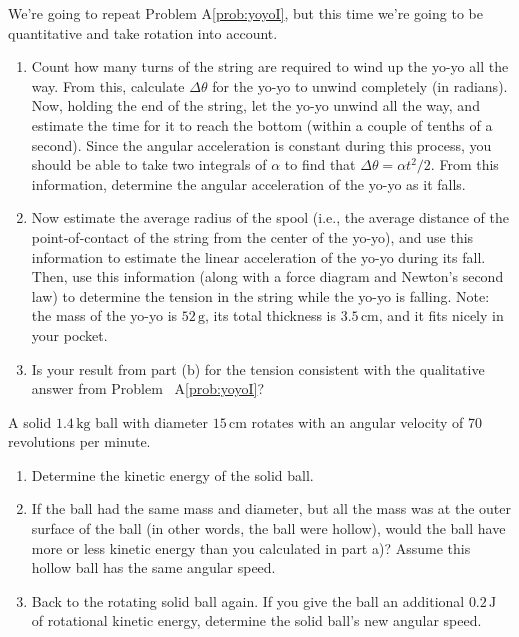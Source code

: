 \begin{exercise}
  We're going to repeat Problem A\ref{prob:yoyoI}, but this time we're
  going to be quantitative and take rotation into account.
  \begin{enumerate}
  \item Count how many turns of the string are required to wind up the
    yo-yo all the way.  From this, calculate $\Delta\theta$ for the
    yo-yo to unwind completely (in radians).  Now, holding the end of
    the string, let the yo-yo unwind all the way, and estimate the
    time for it to reach the bottom (within a couple of tenths of a
    second). Since the angular acceleration is constant during this
    process, you should be able to take two integrals of $\alpha$ to
    find that $\Delta\theta = \alpha t^2/2$.  From this information,
    determine the angular acceleration of the yo-yo as it falls.

  \item Now estimate the average radius of the spool (i.e., the
    average distance of the point-of-contact of the string from the
    center of the yo-yo), and use this information to estimate the
    linear acceleration of the yo-yo during its fall.  Then, use this
    information (along with a force diagram and Newton's second law)
    to determine the tension in the string while the yo-yo is falling.
    Note: the mass of the yo-yo is $52\,\text{g}$, its total
    thickness is $3.5\,\text{cm}$, and it fits nicely in your pocket.

  \item Is your result from part (b) for the tension consistent with
    the qualitative answer from Problem~ A\ref{prob:yoyoI}?

  \end{enumerate}
\end{exercise}

\begin{exercise}
  A solid $1.4\,\text{kg}$ ball with diameter $15\,\text{cm}$
  rotates with an angular velocity of 70 revolutions per minute.
  \begin{enumerate}
  \item Determine the kinetic energy of the solid ball.
  \item If the ball had the same mass and diameter, but all the mass
    was at the outer surface of the ball (in other words, the ball
    were hollow), would the ball have more or less kinetic energy than
    you calculated in part a)?  Assume this hollow ball has the same
    angular speed.
  \item Back to the rotating solid ball again.  If you give the ball an 
    additional $0.2\,\mbox{J}$ of rotational kinetic energy, determine 
    the solid ball's new angular speed.
  \end{enumerate}
  \label{prob:ball_turns}
\end{exercise}

